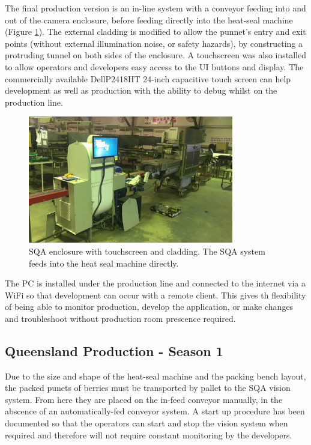 \documentclass[fleqn,twoside]{article}
\begin{document}
The final production version is an in-line system with a conveyor feeding into and out of the camera enclosure, before feeding directly into the heat-seal machine (Figure \ref{fig:production_final}). The external cladding is modified to allow the punnet's entry and exit points (without  external illumination noise, or safety hazards), by constructing a protruding tunnel on both sides of the enclosure. A touchscreen was also installed to allow operators and developers easy access to the UI buttons and display. The commercially available Dell\textregistered P2418HT 24-inch capacitive touch screen can help development as well as production with the ability to debug whilst on the production line.


\begin{figure}[ht]
	\centering
	\includegraphics[width=0.8\textwidth]{images/production_final.JPG}
	\caption{SQA enclosure with touchscreen and cladding. The SQA system feeds into the heat seal machine directly.}
	\label{fig:production_final}
\end{figure}

The PC is installed under the production line and connected to the internet via a WiFi so that development can occur with a remote client. This gives th flexibility of being able to monitor production, develop the application, or make changes and troubleshoot without production room prescence required.




\subsection{Queensland Production - Season 1}

Due to the size and shape of the heat-seal machine and the packing bench layout, the packed punets of berries must be transported by pallet to the SQA vision system. From here they are placed on the in-feed conveyor manually, in the abscence of an automatically-fed conveyor system. A start up procedure has been documented so that the operators can start and stop the vision system when required and therefore will not require constant monitoring by the developers. 
\end{document}
